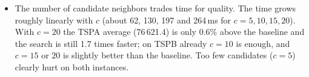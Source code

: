 \documentclass[11pt,a4paper]{article}
\begin{document}
\begin{itemize}
        node costs of TSPA are twice as large as those of TSPB (up to 1\,997 vs.\ 999), so they
        dominate the score $D[u][v] + \mathit{cost}[v]$ and the 10 ``nearest'' nodes are often cheap
        but distant nodes, while short edges are left out. Indeed, 9 of the 100 edges of the best
        baseline solution of TSPA are not candidate edges for $c = 10$, compared with only 2 for
        TSPB. The search cannot add such edges, so it stops earlier in worse local optima.
  \item The number of candidate neighbors trades time for quality. The time grows roughly
        linearly with $c$ (about 62, 130, 197 and 264\,ms for $c = 5, 10, 15, 20$). With $c = 20$ the
        TSPA average (76\,621.4) is only 0.6\% above the baseline and the search is still 1.7 times
        faster; on TSPB already $c = 10$ is enough, and $c = 15$ or $20$ is slightly better than the
        baseline. Too few candidates ($c = 5$) clearly hurt on both instances.
\end{itemize}
\end{document}
